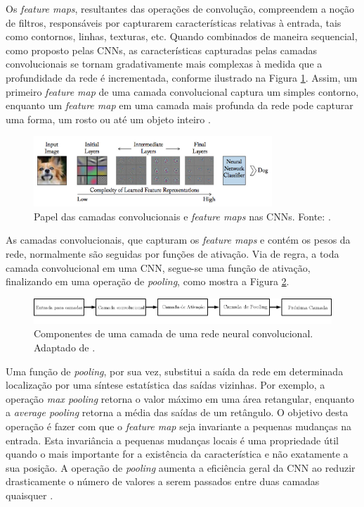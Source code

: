 Os \emph{feature maps}, resultantes das operações de convolução, compreendem a noção de filtros, responsáveis por capturarem características relativas à entrada, tais como contornos, linhas, texturas, etc. Quando combinados de maneira sequencial, como proposto pelas CNNs, as características capturadas pelas camadas convolucionais se tornam gradativamente mais complexas à medida que a profundidade da rede é incrementada, conforme ilustrado na Figura \ref{fig:convolutions}. Assim, um primeiro \emph{feature map} de uma camada convolucional captura um simples contorno, enquanto um \emph{feature map} em uma camada mais profunda da rede pode capturar uma forma, um rosto ou até um objeto inteiro \cite{Buduma:Livro}.

\begin{figure}[!ht]
	\centering
	\caption{Papel das camadas convolucionais e \emph{feature maps} nas CNNs. Fonte: \cite{Khan:Livro}.}
	\label{fig:convolutions}
	\includegraphics[width=0.8\textwidth]{./img/fundamenta/convolutions}
\end{figure}

As camadas convolucionais, que capturam os \emph{feature maps} e contém os pesos da rede, normalmente são seguidas por funções de ativação. Via de regra, a toda camada convolucional em uma CNN, segue-se uma função de ativação, finalizando em uma operação de \emph{pooling}, como mostra a Figura \ref{fig:cnn_camada}.

\begin{figure}[!ht]
	\centering
	\caption{Componentes de uma camada de uma rede neural convolucional. Adaptado de \cite{goodfellow2016deep}.}
	\label{fig:cnn_camada}
	\includegraphics[width=\textwidth]{img/cnn_camada_ipe.png}
\end{figure}

 Uma função de \emph{pooling}, por sua vez, substitui a saída da rede em determinada localização por uma síntese estatística das saídas vizinhas. Por exemplo, a operação \emph{max pooling} retorna o valor máximo em uma área retangular, enquanto a \emph{average pooling} retorna a média das saídas de um retângulo. O objetivo desta operação é fazer com que o \emph{feature map} seja invariante a pequenas mudanças na entrada. Esta invariância a pequenas mudanças locais é uma propriedade útil quando o mais importante for a existência da característica e não exatamente a sua posição. A operação de \emph{pooling} aumenta a eficiência geral da CNN ao reduzir drasticamente o número de valores a serem passados entre duas camadas quaisquer \cite{goodfellow2016deep}.

